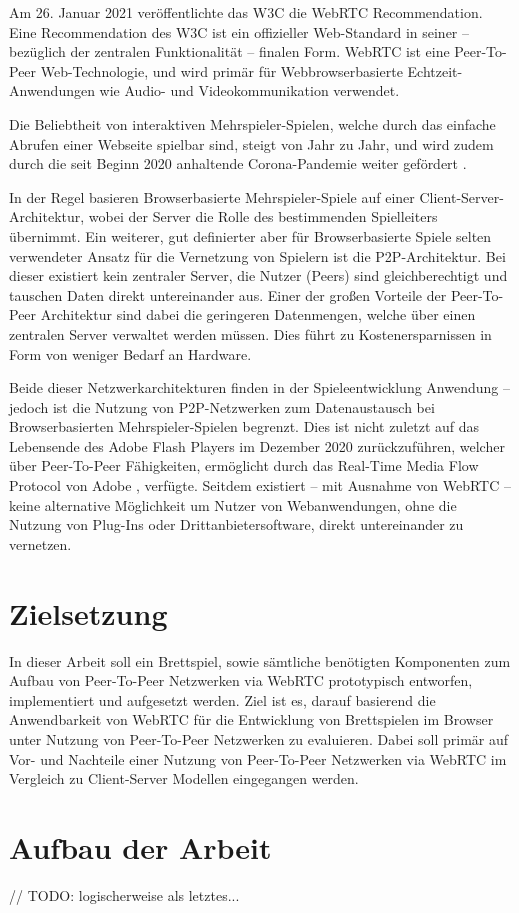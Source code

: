 Am 26. Januar 2021 veröffentlichte das \ac{W3C} die \ac{WebRTC} Recommendation. Eine Recommendation des \acs{W3C} ist ein offizieller Web-Standard in seiner -- bezüglich der zentralen Funktionalität -- finalen Form. \acs{WebRTC} ist eine Peer-To-Peer Web-Technologie, und wird primär für Webbrowserbasierte Echtzeit-Anwendungen wie Audio- und Videokommunikation verwendet.\par

Die Beliebtheit von interaktiven Mehrspieler-Spielen, welche durch das einfache Abrufen einer Webseite spielbar sind, steigt von Jahr zu Jahr, und wird zudem durch die seit Beginn 2020 anhaltende Corona-Pandemie weiter gefördert \cite{BGMarket}.\par

In der Regel basieren Browserbasierte Mehrspieler-Spiele auf einer Client-Server-Architektur, wobei der Server die Rolle des bestimmenden Spielleiters übernimmt. Ein weiterer, gut definierter aber für Browserbasierte Spiele selten verwendeter Ansatz für die Vernetzung von Spielern ist die \acf{P2P}-Architektur. Bei dieser existiert kein zentraler Server, die Nutzer (Peers) sind gleichberechtigt und tauschen Daten direkt untereinander aus. Einer der großen Vorteile der Peer-To-Peer Architektur sind dabei die geringeren Datenmengen, welche über einen zentralen Server verwaltet werden müssen. Dies führt zu Kostenersparnissen in Form von weniger Bedarf an Hardware.\par

Beide dieser Netzwerkarchitekturen finden in der Spieleentwicklung Anwendung -- jedoch ist die Nutzung von \acs{P2P}-Netzwerken zum Datenaustausch bei Browserbasierten Mehrspieler-Spielen begrenzt. Dies ist nicht zuletzt auf das Lebensende des Adobe Flash Players im Dezember 2020 zurückzuführen, welcher über Peer-To-Peer Fähigkeiten, ermöglicht durch das Real-Time Media Flow Protocol von Adobe \cite{adobeRFC}, verfügte. Seitdem existiert -- mit Ausnahme von \acs{WebRTC} -- keine alternative Möglichkeit um Nutzer von Webanwendungen, ohne die Nutzung von Plug-Ins oder Drittanbietersoftware, direkt untereinander zu vernetzen.\par

\section{Zielsetzung}
In dieser Arbeit soll ein Brettspiel, sowie sämtliche benötigten Komponenten zum Aufbau von Peer-To-Peer Netzwerken via \acs{WebRTC} prototypisch entworfen, implementiert und aufgesetzt werden. Ziel ist es, darauf basierend die Anwendbarkeit von \acs{WebRTC} für die Entwicklung von Brettspielen im Browser unter Nutzung von Peer-To-Peer Netzwerken zu evaluieren. Dabei soll primär auf Vor- und Nachteile einer Nutzung von Peer-To-Peer Netzwerken via \acs{WebRTC} im Vergleich zu Client-Server Modellen eingegangen werden.

\section{Aufbau der Arbeit}
// TODO: logischerweise als letztes...
